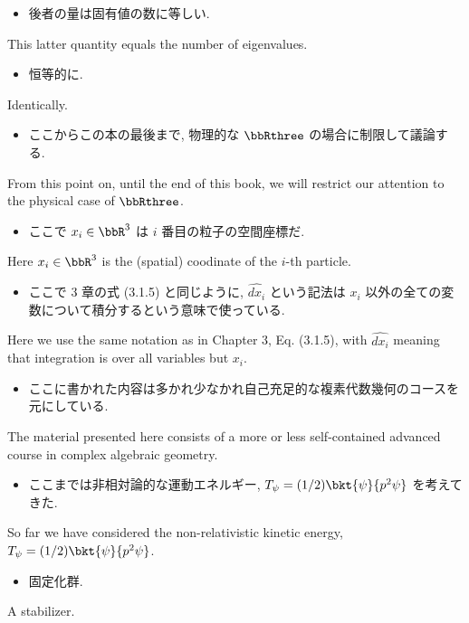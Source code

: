 \documentclass[openany, a4paper, oneside]{jsbook}
\begin{document}
\begin{itemize}
\item 後者の量は固有値の数に等しい. \cite{LiebSeiringer1}
\end{itemize}
This latter quantity equals the number of eigenvalues.

\begin{itemize}
\item 恒等的に.
\end{itemize}
Identically.

\begin{itemize}
\item ここからこの本の最後まで, 物理的な $\bbRthree$ の場合に制限して議論する. \cite{LiebSeiringer1}
\end{itemize}
From this point on, until the end of this book, we will restrict our attention to
the physical case of $\bbRthree$.

\begin{itemize}
\item ここで $x_i \in \bbR^3$ は $i$ 番目の粒子の空間座標だ. \cite{LiebSeiringer1}
\end{itemize}
Here $x_i \in \bbR^3$ is the (spatial) coodinate of the $i$-th particle.

\begin{itemize}
\item ここで 3 章の式 (3.1.5) と同じように, $\hat{dx_i}$ という記法は $x_i$ 以外の全ての変数について積分するという意味で使っている. \cite{LiebSeiringer1}
\end{itemize}
Here we use the same notation as in Chapter 3, Eq. (3.1.5), with $\hat{dx_i}$
meaning that integration is over all variables but $x_i$.

\begin{itemize}
\item ここに書かれた内容は多かれ少なかれ自己充足的な複素代数幾何のコースを元にしている. \cite{ChrisPeters1}
\end{itemize}
The material presented here consists of a more or less
self-contained advanced course in complex algebraic geometry.

\begin{itemize}
\item ここまでは非相対論的な運動エネルギー, $T_{\psi} = (1/2) \bkt{\psi}{p^2 \psi}$ を考えてきた. \cite{LiebSeiringer1}
\end{itemize}
So far we have considered the non-relativistic kinetic energy, $T_{\psi} = (1/2) \bkt{\psi}{p^2 \psi}$.

\begin{itemize}
\item 固定化群.
\end{itemize}
A stabilizer.
\end{document}
